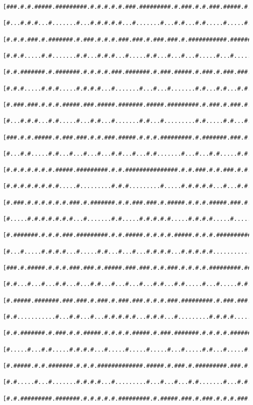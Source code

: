 \documentclass[a4paper,10pt,ngerman]{scrartcl}
\begin{document}
\begin{lstlisting}[frame=tb,basicstyle=\tiny\ttfamily]
 [###.#.#.#####.#########.#.#.#.#.#.###.#########.#.###.#.#.###.#####.#.#.#######.#.###.###.#.#####.#.#]
 [#...#.#.#...#.......#...#.#.#.#.#...#.......#...#.#...#.#.....#.....#.#.......#...#.....#.#...#...#.#]
 [#.#.#.###.#.#######.#.###.#.#.#.###.###.#.###.###.#.###########.#############.#########.#.#.###.#.#.#]
 [#.#.#.....#.#.......#.#...#.#.#...#.....#.#...#...#...#.....#...#.....#.....#...#.......#...#...#.#.#]
 [#.#.#######.#.#######.#.#.#.#.###.#######.#.###.#####.#.###.#.###.###.#.###.###.###.###.###.#.#####.#]
 [#.#.#.....#.#.#.....#.#.#.#...#.......#...#...#.......#.#...#.#...#.#.#.#.#.#...#...#.#.#.#.#.......#]
 [#.###.###.#.#.#.#####.###.#####.#######.#####.#########.#.###.#.###.#.#.#.#.#.###.###.#.#.#.#########]
 [#...#.#.#...#.#.....#...#.#...#.......#.#...#.........#.#.....#.#...#.#.#...#.#...#...#...#.#.......#]
 [###.#.#.#####.#.###.###.#.#.###.#####.#.#.#.#########.#.#######.###.#.#.#.###.#.###.#####.#.#.###.#.#]
 [#...#.#.....#.#...#...#...#...#.#...#...#.#.......#...#...#.#.....#.#.#.#.#...#.#.........#.#...#.#.#]
 [#.#.#.#.#.#.#.#####.#########.#.#.###############.#.#.###.#.#.###.#.#.#.#.#.###.#.#########.#####.#.#]
 [#.#.#.#.#.#.#.#.....#.........#.#.#.........#.....#.#.#.#.#...#...#.#.#.#...#...#.#.....#.#.....#.#.#]
 [#.###.#.#.#.#.#.#.###.#.#######.#.#.###.###.#.#####.#.#.#.#####.###.#.#.#####.###.###.#.#.#####.#.#.#]
 [#.....#.#.#.#.#.#.#...#.......#.#.....#.#.#.#.#.....#.#.#.#.....#.......#...#...#.....#.#.#.....#.#.#]
 [#.#######.#.#.#.###.#########.#.#.#####.#.#.#.#.#####.#.#.#.#############.#.#.#.#######.#.#.#####.#.#]
 [#...#.....#.#.#.#...#.....#.#...#...#...#.#.#.#...#.#.#.#.#...............#.#.#.......#...#...#...#.#]
 [###.#.#####.#.#.#.###.###.#.#####.###.###.#.#.###.#.#.#.#.#########.#######.#.#######.#######.#.#####]
 [#.#...#...#...#.#...#...#.#...#...#...#...#.#...#.#.....#...#.....#.#...#...#...#.....#.....#.#.....#]
 [#.#####.#######.###.###.#.###.#.###.###.#.#.#.###.#########.#.###.###.#.#.#######.###.#.###.#.#.###.#]
 [#.#...........#...#.#...#...#.#.#.#.#...#.#.#...#.........#.#.#.#.....#.#.....#...#.#.#.#.#.#.#.#...#]
 [#.#.#######.#.###.#.#.#####.#.#.#.#.#####.#.###.#######.#.#.#.#.#######.#.###.#.###.#.#.#.#.#.###.#.#]
 [#.....#...#.#.....#.#.#.#...#.....#.....#.....#...#.....#.#...#.....#...#.#...#.#.....#...#.#.#...#.#]
 [#.#####.#.#.#######.#.#.#.#############.#####.#.###.#.#########.###.#.#####.###.###.###.###.#.#.###.#]
 [#.#.....#...#.......#.#.#.#...#.........#...#...#...#.#.......#...#.#.#.....#.....#...#.#...#...#.#.#]
 [#.#.#########.#######.#.#.#.#.#.#########.#.#####.###.#.###.#.#.#.###.###.###.###.#####.#.#######.#.#]

\end{lstlisting}
\end{document}
